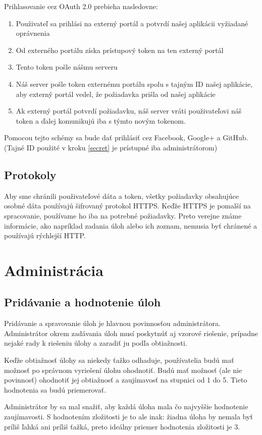 Prihlasovanie cez OAuth 2.0 prebieha nasledovne:
\begin{enumerate}
\item{Použivateľ sa prihlási na externý portál a potvrdí našej aplikácii vyžiadané oprávnenia}
\item{Od externého portálu získa prístupový token na ten externý portál}
\item \label{secret}{Tento token pošle nášmu serveru}
\item{Náš server pošle token externému portálu spolu s tajným ID našej aplikácie, aby externý portál vedel, že požiadavka prišla od našej aplikácie}
\item{Ak externý portál potvrdí požiadavku, náš server vráti použivateľovi náš token a ďalej komunikujú iba s týmto novým tokenom.}
\end{enumerate}

Pomocou tejto schémy sa bude dať prihlásiť cez Facebook, Google+ a GitHub.
\newline
(Tajné ID použité v kroku \ref{secret} je prístupné iba administrátorom)

\subsection{Protokoly}
Aby sme chránili použivateľové dáta a token, všetky požiadavky obsahujúce osobné dáta používajú šifrovaný protokol HTTPS. Keďže HTTPS je pomalší na spracovanie,
používame ho iba na potrebné požiadavky. Preto verejne známe informácie, ako napríklad zadania úloh alebo ich zoznam, nemusia byť chránené a používajú rýchlejší HTTP.
\section{Administrácia}
\subsection{Pridávanie a hodnotenie úloh}
Pridávanie a spravovanie úloh je hlavnou povinnosťou administrátora. Administrátor okrem zadávania úloh musí poskytnúť aj vzorové riešenie, prípadne nejaké rady k riešeniu úlohy a zaradiť ju podľa obtiažnosti.

Keďže obtiažnosť úlohy sa niekedy ťažko odhaduje, používatelia budú mať možnosť po správnom vyriešení úlohu ohodnotiť. Budú mať možnosť (ale nie povinnosť) ohodnotiť jej obtiažnosť a zaujímavosť na stupnici od 1 do 5. Tieto hodnotenia sa budú priemerovať.

Administrátor by sa mal snažiť, aby každá úloha mala čo najvyššie hodnotenie zaujímavosti. S hodnotením zložitosti je to ale inak: žiadna úloha by nemala byť príliš ľahká ani príliš ťažká, preto ideálny priemer hodnotenia zložitosti je 3.

